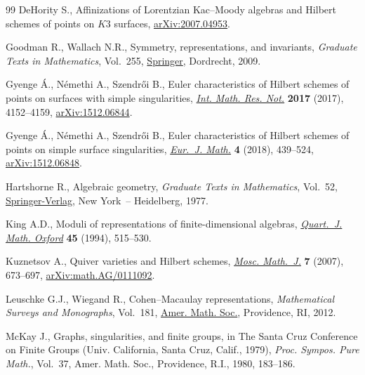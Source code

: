 \begin{thebibliography}{99}
DeHority S., Affinizations of {L}orentzian {K}ac--{M}oody algebras and
 {H}ilbert schemes of points on {$K3$} surfaces, \href{https://arxiv.org/abs/2007.04953}{arXiv:2007.04953}.

Goodman R., Wallach N.R., Symmetry, representations, and invariants,
 \textit{Graduate Texts in Mathematics}, Vol.~255, \href{https://doi.org/10.1007/978-0-387-79852-3}{Springer}, Dordrecht, 2009.

Gyenge \'A., N\'emethi A., Szendr\H{o}i B., Euler characteristics of {H}ilbert
 schemes of points on surfaces with simple singularities, \href{https://doi.org/10.1093/imrn/rnw139}{\textit{Int. Math.
 Res. Not.}} \textbf{2017} (2017), 4152--4159, \href{https://arxiv.org/abs/1512.06844}{arXiv:1512.06844}.

Gyenge \'A., N\'emethi A., Szendr\H{o}i B., Euler characteristics of {H}ilbert
 schemes of points on simple surface singularities, \href{https://doi.org/10.1007/s40879-018-0222-4}{\textit{Eur.~J. Math.}}
 \textbf{4} (2018), 439--524, \href{https://arxiv.org/abs/1512.06848}{arXiv:1512.06848}.

Hartshorne R., Algebraic geometry, \textit{Graduate Texts in Mathematics},
 Vol.~52, \href{https://doi.org/10.1007/978-1-4757-3849-0}{Springer-Verlag}, New York~-- Heidelberg, 1977.

King A.D., Moduli of representations of finite-dimensional algebras,
 \href{https://doi.org/10.1093/qmath/45.4.515}{\textit{Quart.~J. Math. Oxford}} \textbf{45} (1994), 515--530.

Kuznetsov A., Quiver varieties and {H}ilbert schemes, \href{https://doi.org/10.17323/1609-4514-2007-7-4-673-697}{\textit{Mosc. Math.~J.}}
 \textbf{7} (2007), 673--697, \href{https://arxiv.org/abs/math.AG/0111092}{arXiv:math.AG/0111092}.

Leuschke G.J., Wiegand R., Cohen--{M}acaulay representations,
 \textit{Mathematical Surveys and Monographs}, Vol.~181, \href{https://doi.org/10.1090/surv/181}{Amer. Math. Soc.},
 Providence, RI, 2012.

McKay J., Graphs, singularities, and finite groups, in The {S}anta {C}ruz
 {C}onference on {F}inite {G}roups ({U}niv. {C}alifornia, {S}anta {C}ruz,
 {C}alif., 1979), \textit{Proc. Sympos. Pure Math.}, Vol.~37, Amer. Math.
 Soc., Providence, R.I., 1980, 183--186.


\end{thebibliography}
